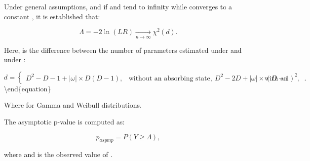 \documentclass[
]{article}
\begin{document}
Under general assumptions, and if and tend to infinity while converges
to a constant , it is established that:

\begin{equation}
\Lambda = -2 \ln (LR) \underset{n \to \infty}{\longrightarrow} \chi^2(d).
\end{equation}

Here, is the difference between the number of parameters estimated under
and under :

\begin{equation}
d =
\begin{cases}
D^2 - D - 1 + |\omega| \times D(D - 1), & \text{without an absorbing state}, \
D^2 - 2D + |\omega| \times (D - 1)^2, & \text{with an absorbing state}.
\end{cases}
\end{equation}\textbackslash end\{equation\}

Where for Gamma and Weibull distributions.

The asymptotic p-value is computed as:

\begin{equation}
p_{asymp} = P(Y \geq \Lambda),
\end{equation}

where and is the observed value of .
\end{document}

